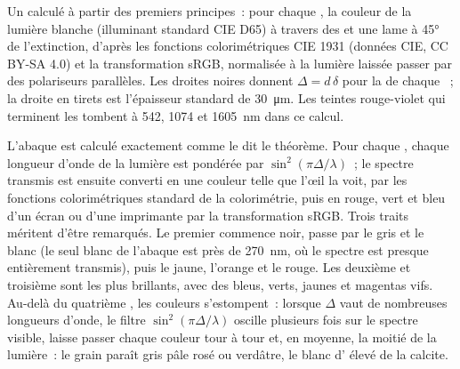 \begin{omfigure}
{\small Un  calculé à partir des premiers principes~: pour
chaque , la couleur de la lumière blanche (illuminant standard
CIE D65) à travers des  et une lame à \ang{45} de l'extinction,
d'après les fonctions colorimétriques CIE 1931 (données \textcopyright{} CIE,
CC BY-SA 4.0) et la transformation sRGB, normalisée à la lumière laissée passer
par des polariseurs parallèles. Les droites noires donnent $\Delta = d\,\delta$
pour la  de chaque ~; la droite en tirets est l'épaisseur
standard de \qty{30}{\micro m}. Les teintes rouge-violet qui terminent les 
tombent à 542, 1074 et \qty{1605}{nm} dans ce calcul.}
\end{omfigure}

L'abaque est calculé exactement comme le dit le théorème. Pour chaque , chaque longueur d'onde de la lumière est pondérée par
$\sin^2(\pi\Delta/\lambda)$~; le spectre transmis est ensuite converti en une
couleur telle que l'œil la voit, par les fonctions colorimétriques standard de la
colorimétrie, puis en rouge, vert et bleu d'un écran ou d'une imprimante par la
transformation sRGB. Trois traits méritent d'être remarqués. Le premier 
commence noir, passe par le gris et le blanc (le seul blanc de l'abaque est près
de \qty{270}{nm}, où le spectre est presque entièrement transmis), puis le jaune,
l'orange et le rouge. Les deuxième et troisième  sont les plus brillants,
avec des bleus, verts, jaunes et magentas vifs. Au-delà du quatrième , les
couleurs s'estompent~: lorsque $\Delta$ vaut de nombreuses longueurs d'onde, le
filtre $\sin^2(\pi\Delta/\lambda)$ oscille plusieurs fois sur le spectre visible,
laisse passer chaque couleur tour à tour et, en moyenne, la moitié de la lumière~:
le grain paraît gris pâle rosé ou verdâtre, le blanc d' élevé de la calcite.

